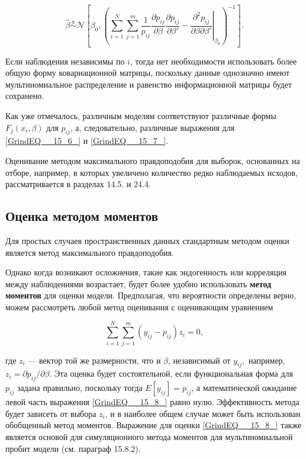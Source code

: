 \begin{equation} 
\label{GrindEQ__15_7_} 
\widehat{\beta }\overset{a}{\sim }{\mathcal N}
\left[{\beta }_0,
{\left({\left.\sum^N_{i=1}{\sum^m_{j=1}{\frac{1}{p_{ij}}\frac{\partial p_{ij}}{\partial \beta }
\frac{\partial p_{ij}}{\partial {\beta }'}-
\frac{{\partial }^2p_{ij}}{\partial \beta \partial{\beta }'}}}\right|}_{{\beta }_0}\right)}^{-1}
\right]. 
\end{equation} 

Если наблюдения независимы по $i$, тогда нет необходимости использовать более общую форму ковариационной матрицы, поскольку данные однозначно имеют мультиномиальное распределение и равенство информационной матрицы будет сохранено.

Как уже отмечалось, различным моделям соответствуют различные формы $F_j(x_i,\beta )$ для $p_{ij}$, а, следовательно, различные выражения для \eqref{GrindEQ__15_6_} и \eqref{GrindEQ__15_7_}.

Оценивание методом максимального правдоподобия для выборок, основанных на отборе, например, в которых увеличено количество редко наблюдаемых исходов, рассматривается в разделах 14.5. и 24.4.

\subsection{ Оценка методом моментов}

Для простых случаев пространственных данных стандартным методом оценки является метод максимального правдоподобия.

Однако когда возникают осложнения, такие как эндогенность или корреляция между наблюдениями  возрастает, будет более удобно использовать \textbf{метод моментов} для оценки модели. Предполагая, что вероятности определены верно, можем рассмотреть любой метод оценивания с оценивающим уравнением

\begin{equation} 
\label{GrindEQ__15_8_} 
\sum^N_{i=1}{\sum^m_{j=1}{\left(y_{ij}-p_{ij}\right)z_i=0,}} 
\end{equation} 

где $z_i$ --- вектор той же размерности, что и $\beta $, независимый от $y_{ij},$ например, $z_i={\partial p_{ij}}/{\partial \beta }.$ Эта оценка будет состоятельной, если функциональная форма для $p_{ij}$ задана правильно, поскольку тогда $E\left[y_{ij}\right]=p_{ij}$, а математической ожидание левой часть выражения \eqref{GrindEQ__15_8_}  равно нулю. Эффективность метода будет зависеть от выбора $z_i$, и в наиболее общем случае может быть использован обобщенный метод моментов. Выражение для оценки \eqref{GrindEQ__15_8_} также является основой для симуляционного метода моментов для мультиномиальной пробит модели (см. параграф 15.8.2).

